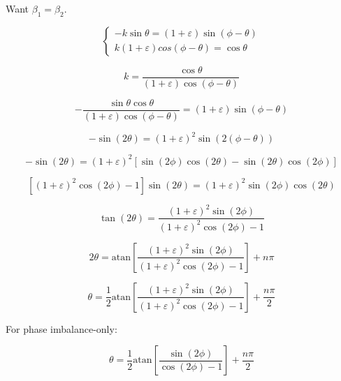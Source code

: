 \documentclass{article}
\begin{document}
Want $\beta_1 = \beta_2$.

\begin{equation}
	\begin{cases}
		-k\sin\theta=(1+\varepsilon)\sin(\phi-\theta)\\
		k(1+\varepsilon)cos(\phi-\theta)=\cos\theta
	\end{cases}
\end{equation}

\begin{equation}
	k = \frac{\cos\theta}{(1+\varepsilon)\cos(\phi-\theta)}
\end{equation}

\begin{equation}
	-\frac{\sin\theta\cos\theta}{(1+\varepsilon)\cos(\phi-\theta)}=(1+\varepsilon)\sin(\phi-\theta)
\end{equation}

\begin{equation}
	-\sin(2\theta)=(1+\varepsilon)^2\sin(2(\phi-\theta))
\end{equation}

\begin{equation}
	-\sin(2\theta)=(1+\varepsilon)^2\left[\sin(2\phi)\cos(2\theta) - \sin(2\theta)\cos(2\phi)\right]
\end{equation}

\begin{equation}
	\left[(1+\varepsilon)^2\cos(2\phi)-1\right]\sin(2\theta)=(1+\varepsilon)^2\sin(2\phi)\cos(2\theta)
\end{equation}

\begin{equation}
	\tan(2\theta)=\frac{(1+\varepsilon)^2\sin(2\phi)}{(1+\varepsilon)^2\cos(2\phi)-1}
\end{equation}

\begin{equation}
	2\theta = \text{atan}\left[\frac{(1+\varepsilon)^2\sin(2\phi)}{(1+\varepsilon)^2\cos(2\phi)-1}\right]+n\pi
\end{equation}

\begin{equation}
	\theta = \frac{1}{2}\text{atan}\left[\frac{(1+\varepsilon)^2\sin(2\phi)}{(1+\varepsilon)^2\cos(2\phi)-1}\right]+\frac{n\pi}{2}
\end{equation}

For phase imbalance-only:

\begin{equation}
	\theta = \frac{1}{2}\text{atan}\left[\frac{\sin(2\phi)}{\cos(2\phi)-1}\right]+\frac{n\pi}{2}
\end{equation}
\end{document}
